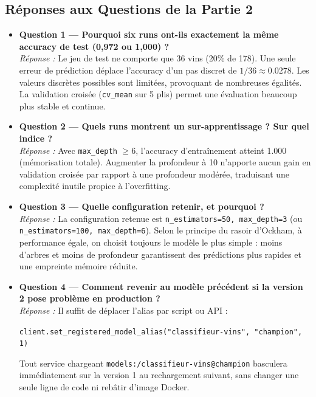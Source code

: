\documentclass[12pt,a4paper]{article}
\begin{document}
\subsection{Réponses aux Questions de la Partie 2}
\begin{itemize}[leftmargin=*]
  \item \textbf{Question 1 — Pourquoi six runs ont-ils exactement la même accuracy de test (0,972 ou 1,000) ?}\\
  \textit{Réponse :} Le jeu de test ne comporte que 36 vins (20\% de 178). Une seule erreur de prédiction déplace l'accuracy d'un pas discret de $1/36 \approx 0.0278$. Les valeurs discrètes possibles sont limitées, provoquant de nombreuses égalités. La validation croisée (\texttt{cv\_mean} sur 5 plis) permet une évaluation beaucoup plus stable et continue.

  \item \textbf{Question 2 — Quels runs montrent un sur-apprentissage ? Sur quel indice ?}\\
  \textit{Réponse :} Avec \texttt{max\_depth} $\ge 6$, l'accuracy d'entraînement atteint 1.000 (mémorisation totale). Augmenter la profondeur à 10 n'apporte aucun gain en validation croisée par rapport à une profondeur modérée, traduisant une complexité inutile propice à l'overfitting.

  \item \textbf{Question 3 — Quelle configuration retenir, et pourquoi ?}\\
  \textit{Réponse :} La configuration retenue est \texttt{n\_estimators=50, max\_depth=3} (ou \texttt{n\_estimators=100, max\_depth=6}). Selon le principe du rasoir d'Ockham, à performance égale, on choisit toujours le modèle le plus simple : moins d'arbres et moins de profondeur garantissent des prédictions plus rapides et une empreinte mémoire réduite.

  \item \textbf{Question 4 — Comment revenir au modèle précédent si la version 2 pose problème en production ?}\\
  \textit{Réponse :} Il suffit de déplacer l'alias par script ou API :
  \begin{center}
  \texttt{client.set\_registered\_model\_alias("classifieur-vins", "champion", 1)}
  \end{center}
  Tout service chargeant \texttt{models:/classifieur-vins@champion} basculera immédiatement sur la version 1 au rechargement suivant, sans changer une seule ligne de code ni rebâtir d'image Docker.
\end{itemize}
\end{document}

